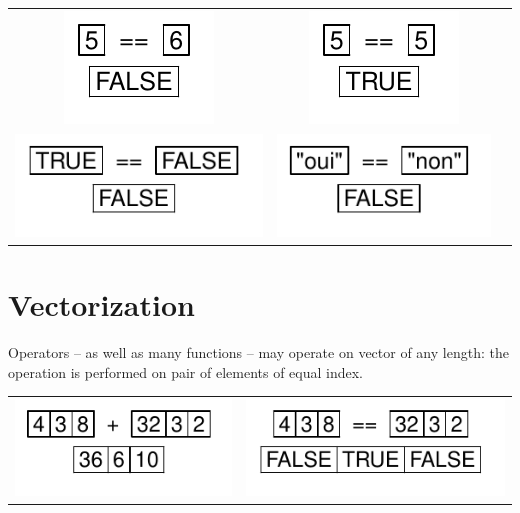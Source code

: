 \documentclass[pdflatex]{article}
\begin{document}
\begin{tabular}{ccc}
\includegraphics{operator_equality_num} & \includegraphics{operator_equality_num_TRUE}\\
\includegraphics{operator_equality_log} & \includegraphics{operator_equality_char}\\
\end{tabular}

\section{Vectorization}

Operators -- as well as many functions -- may operate on vector of any length: the operation is performed on pair of elements of equal index.

\begin{tabular}{cc}
\includegraphics{operator_plus_vectorized} & \includegraphics{operator_equal_vectorized}\\
\end{tabular}
\end{document}
